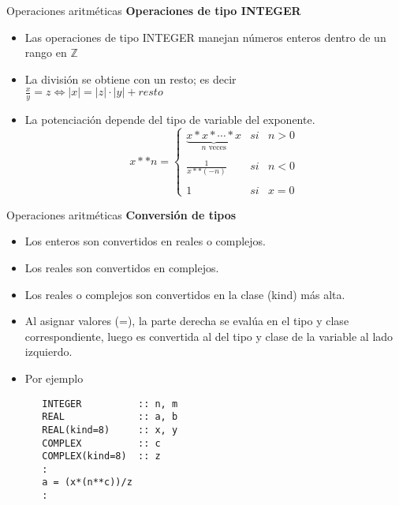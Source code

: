 \begin{frame}[fragile]{Operaciones aritméticas}
\textbf{Operaciones de tipo INTEGER}
 \begin{itemize}[<+(0)->]
  \item Las operaciones de tipo INTEGER manejan números enteros dentro de un rango en $\mathbb{Z}$
  \item La división se obtiene con un resto; es decir\\
  \centering $\frac{x}{y} = z \Longleftrightarrow  |x| = |z| \cdot |y| + resto $
  \item La potenciación depende del tipo de variable del exponente. 
  $$
  x**n = \left\{ \begin{array}{lcc}
             \underbrace{x \ast x \ast \cdots \ast x}_\text{$n$ veces} &   si  & n > 0 \\
             \\ \frac{1}{x \ast \ast (-n)} &  si & n < 0 \\
             \\ 1 &  si  & x = 0 
             \end{array}
   \right.
  $$
 \end{itemize}
\end{frame}

\begin{frame}[fragile]{Operaciones aritméticas}
\textbf{Conversión de tipos}
 \begin{itemize}[<+(0)->]
  \item Los enteros son convertidos en reales o complejos.
  \item Los reales son convertidos en complejos.
  \item Los reales o complejos son convertidos en la clase (kind) más alta.
  \item Al asignar valores (=), la parte derecha se evalúa en el tipo y clase correspondiente, luego es convertida al del tipo y clase de la variable al lado izquierdo.
  \item[] Por ejemplo
  \begin{verbatim}
   INTEGER          :: n, m 
   REAL             :: a, b
   REAL(kind=8)     :: x, y
   COMPLEX          :: c
   COMPLEX(kind=8)  :: z
   :
   a = (x*(n**c))/z
   :
   \end{verbatim}

 \end{itemize}
\end{frame}


